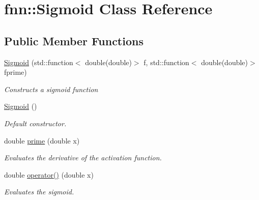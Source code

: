 \hypertarget{classfnn_1_1_sigmoid}{}\section{fnn\+:\+:Sigmoid Class Reference}
\label{classfnn_1_1_sigmoid}
\subsection*{Public Member Functions}
\begin{DoxyCompactItemize}
\item 
\hyperlink{classfnn_1_1_sigmoid_a3ea6f3057765aaf64000c87601b4dedb}{Sigmoid} (std\+::function$<$ double(double)$>$ f, std\+::function$<$ double(double)$>$ fprime)
\begin{DoxyCompactList}\small\item\em Constructs a sigmoid function \end{DoxyCompactList}\item 
\hyperlink{classfnn_1_1_sigmoid_a67b28b32d36e6e831051677234b0e2a4}{Sigmoid} ()
\begin{DoxyCompactList}\small\item\em Default constructor. \end{DoxyCompactList}\item 
double \hyperlink{classfnn_1_1_sigmoid_a90bd1a37bd4ad4f5a4074f364430b85d}{prime} (double x)
\begin{DoxyCompactList}\small\item\em Evaluates the derivative of the activation function. \end{DoxyCompactList}\item 
double \hyperlink{classfnn_1_1_sigmoid_afc3a732e3ab0e5b00601564d4e220283}{operator()} (double x)
\begin{DoxyCompactList}\small\item\em Evaluates the sigmoid. \end{DoxyCompactList}\end{DoxyCompactItemize}
